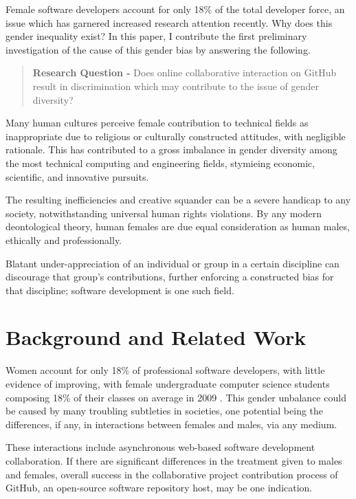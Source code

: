 \documentclass{sigplanconf}
\begin{document}
Female software developers account for only 18\% of the total developer force,
an issue which has garnered increased research attention recently.
\citep{sherdiversity} Why does this gender inequality exist? In this paper, I
contribute the first preliminary investigation of the cause of this gender bias
by answering the following.

\begin{quote}
  \textbf{Research Question -} Does online collaborative interaction on GitHub result in
  discrimination which may contribute to the issue of gender diversity?
\end{quote}

Many human cultures perceive female contribution to technical
fields as inappropriate due to religious or culturally constructed attitudes, with
negligible rationale. \citep{elamin2010saudiwomen} This has contributed to a gross imbalance in gender diversity among
the most technical computing and engineering fields, stymieing economic,
scientific, and innovative pursuits.

The resulting inefficiencies and creative
squander can be a severe handicap to any society, notwithstanding universal human rights
violations. By any modern deontological theory, human females are due equal
consideration as human males, ethically and professionally.

Blatant under-appreciation of an individual or group in a certain
discipline can discourage that group's contributions, further enforcing a
constructed bias for that discipline; software development is one such
field.

\section{Background and Related Work}

Women account for only 18\% of professional software developers,
\cite{sherdiversity} with little evidence of improving, with female
undergraduate computer science students composing 18\% of
their classes on average in 2009 \cite{womenundergrad}. This gender unbalance could be caused by many troubling subtleties
in societies, one potential being the differences, if any, in interactions
between females and males, via any medium.

These interactions include asynchronous web-based software development
collaboration. If there are significant differences in the treatment given to males
and females, overall success in the collaborative project contribution process
of GitHub, an open-source software repository host, may be one indication.
\end{document}

